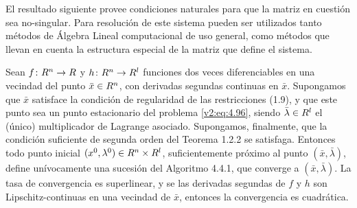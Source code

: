 El resultado siguiente provee condiciones naturales para que la matriz en cuestión sea no-singular. Para resolución de este sistema pueden ser utilizados tanto métodos de Álgebra Lineal computacional de uso general, como métodos que llevan en cuenta la estructura especial de la matriz que define el sistema.

\begin{theorem}\label{v2:thm:4.4.1}
    Sean $f \colon R^n \to R$ y $h \colon R^n \to R^l$ funciones dos veces diferenciables en una vecindad del punto $\bar{x} \in R^n$, con derivadas segundas continuas en $\bar{x}$. Supongamos que $\bar{x}$ satisface la condición de regularidad de las restricciones (1.9), y que este punto sea un punto estacionario del problema \eqref{v2:eq:4.96}, siendo $\bar{\lambda} \in R^l$ el (único) multiplicador de Lagrange asociado. Supongamos, finalmente, que la condición suficiente de segunda orden del Teorema 1.2.2 se satisfaga.
    Entonces todo punto inicial $(x^0, \lambda^0) \in R^n \times R^l$, suficientemente próximo al punto $(\bar{x}, \bar{\lambda})$, define unívocamente una sucesión del Algoritmo 4.4.1, que converge a $(\bar{x}, \bar{\lambda})$. La tasa de convergencia es superlinear, y se las derivadas segundas de $f$ y $h$ son Lipschitz-continuas en una vecindad de $\bar{x}$, entonces la convergencia es cuadrática.
\end{theorem}
